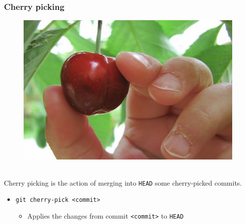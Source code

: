 \documentclass{beamer}
\begin{document}
\begin{frame}
    \frametitle{Cherry picking}
    \begin{figure}
        \includegraphics[scale=0.25]{imgs/pick.jpg}
    \end{figure}
    \hfill \\
    Cherry picking is the action of merging into \texttt{HEAD} some cherry-picked commits.
    \hfill \\
    \begin{itemize}
        \item \texttt{git cherry-pick <commit>}
        \begin{itemize}
            \item Applies the changes from commit \texttt{<commit>} to \texttt{HEAD}
        \end{itemize}
    \end{itemize}
\end{frame}
\end{document}
